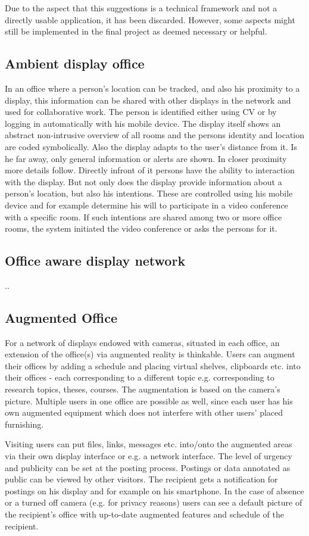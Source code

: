 Due to the aspect that this suggestions is a technical framework and not a directly usable application, it has been discarded.
However, some aspects might still be implemented in the final project as deemed necessary or helpful.

\subsection{Ambient display office}
In an office where a person's location can be tracked, and also his proximity to a display, this information can be shared with other displays in the network and used for collaborative work.
The person is identified either using CV or by logging in automatically with his mobile device.
The display itself shows an abstract non-intrusive overview of all rooms and the persons identity and location are coded symbolically.
Also the display adapts to the user's distance from it.
Is he far away, only general information or alerts are shown.
In closer proximity more details follow. Directly infront of it persons have the ability to interaction with the display.
But not only does the display provide information about a person's location, but also his intentions.
These are controlled using his mobile device and for example determine his will to participate in a video conference with a specific room.
If such intentions are shared among two or more office rooms, the system initiated the video conference or asks the persons for it.

\subsection{Office aware display network}
..

\subsection{Augmented Office}
For a network of displays endowed with cameras, situated in each office, an extension of the office(s) via augmented reality is thinkable.
Users can augment their offices by adding a schedule and placing virtual shelves, clipboards etc. into their offices - each corresponding to a different topic e.g. corresponding to research topics, theses, courses.
The augmentation is based on the camera's picture.
Multiple users in one office are possible as well, since each user has his own augmented equipment which does not interfere with other users' placed furnishing.

Visiting users can put files, links, messages etc. into/onto the augmented areas via their own display interface or e.g. a network interface.
The level of urgency and publicity can be set at the posting process.
Postings or data annotated as public can be viewed by other visitors.
The recipient gets a notification for postings on his display and for example on his smartphone.
In the case of absence or a turned off camera (e.g. for privacy reasons) users can see a default picture of the recipient’s office with up-to-date augmented features and schedule of the recipient.


